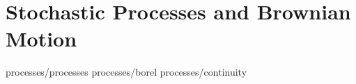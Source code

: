 \chapter	{Stochastic Processes and Brownian Motion}

	{processes/processes}
	{processes/borel}
	{processes/continuity}
